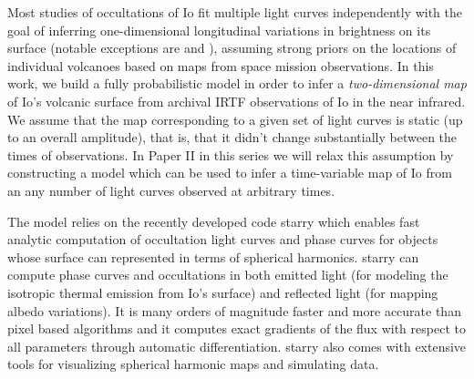 \documentclass[modern]{aastex62}
\begin{document}
Most studies of occultations of Io fit multiple light curves independently with the goal of inferring one-dimensional longitudinal variations in brightness on its surface (notable exceptions are \cite{spencer1994} and \cite{dekleer2017}), assuming strong priors on the locations of individual volcanoes based on maps from space mission observations.
In this work, we build a fully probabilistic model in order to infer a \emph{two-dimensional map} of Io's volcanic surface from archival IRTF observations of Io in the near infrared.
We assume that the map corresponding to a given set of light curves is static (up to an overall amplitude), that is, that it didn't change substantially between the times of observations.
In Paper II in this series we will relax this assumption by constructing a model which can be used to infer a time-variable map of Io from an any number of light curves observed at arbitrary times.

The model relies on the recently developed code \textsf{starry} \citep[][Luger et al. 2021 in prep]{luger2019a} which enables fast analytic computation of occultation light curves and phase curves for objects whose surface can represented in terms of spherical harmonics.
\textsf{starry} can compute phase curves and occultations in both emitted light (for modeling the isotropic thermal emission from Io's surface) and reflected light (for mapping albedo variations).
It is many orders of magnitude faster and more accurate than pixel based algorithms and it computes exact gradients of the flux with respect to all parameters through automatic differentiation.
\textsf{starry} also comes with extensive tools for visualizing spherical harmonic maps and simulating data.
\end{document}
